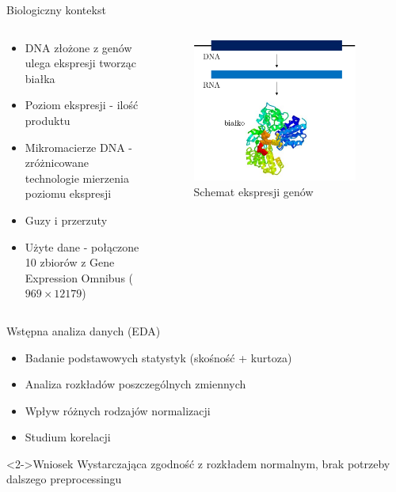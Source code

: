 \documentclass[11pt]{beamer}
\begin{document}
\begin{frame}{Biologiczny kontekst}
\begin{columns}[t]
\begin{column}{0.49\linewidth}
\begin{itemize}
    \item DNA złożone z genów ulega ekspresji tworząc białka
    \item Poziom ekspresji - ilość produktu
    \item Mikromacierze DNA - zróżnicowane technologie mierzenia poziomu ekspresji
    \item Guzy i przerzuty
    \item Użyte dane - połączone 10 zbiorów z Gene Expression Omnibus ($969 \times 12179$)
\end{itemize} 
\end{column}
\begin{column}{0.49\linewidth}
\begin{figure}
\centering
\includegraphics[width=0.9\textwidth]{images/ekspresja.png}
\caption{Schemat ekspresji genów}
\end{figure}
\end{column}
\end{columns}
\end{frame}

\begin{frame}{Wstępna analiza danych (EDA)}

\begin{itemize}
    \item Badanie podstawowych statystyk (skośność + kurtoza)
    \item Analiza rozkładów poszczególnych zmiennych
    \item Wpływ różnych rodzajów normalizacji
    \item Studium korelacji
\end{itemize}

\begin{block}<2->{Wniosek}
Wystarczająca zgodność z rozkładem normalnym, brak potrzeby dalszego preprocessingu
\end{block}
    
\end{frame}
\end{document}
